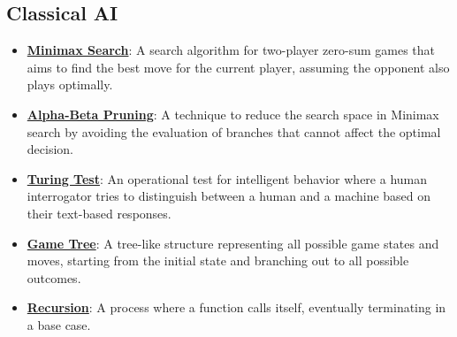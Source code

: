 \documentclass{article}%
\begin{document}
%
\subsection{Classical AI}%
\label{subsec:ClassicalAI}%
\begin{itemize}[leftmargin=*]%
\item \href{https://purdue.brightspace.com/d2l/common/assets/pdfjs-d2l-dist/1.0.14-legacy/web/viewer.html?file=\%2Fcontent\%2Fenforced\%2F1095467-wl.202510.CS.24300.001\%2F02L2-Intro.pdf\%3Fou\%3D1095467\&lang=en-us\&container=d2l-fileviewer-rendered-pdf\&fullscreen=d2l-fileviewer-rendered-pdf-dialog\&height=667#page=22}{\textbf{Minimax Search}}: A search algorithm for two-player zero-sum games that aims to find the best move for the current player, assuming the opponent also plays optimally.%
\item \href{https://purdue.brightspace.com/d2l/common/assets/pdfjs-d2l-dist/1.0.14-legacy/web/viewer.html?file=\%2Fcontent\%2Fenforced\%2F1095467-wl.202510.CS.24300.001\%2F02L2-Intro.pdf\%3Fou\%3D1095467\&lang=en-us\&container=d2l-fileviewer-rendered-pdf\&fullscreen=d2l-fileviewer-rendered-pdf-dialog\&height=667#page=23}{\textbf{Alpha-Beta Pruning}}: A technique to reduce the search space in Minimax search by avoiding the evaluation of branches that cannot affect the optimal decision.%
\item \href{https://purdue.brightspace.com/d2l/common/assets/pdfjs-d2l-dist/1.0.14-legacy/web/viewer.html?file=\%2Fcontent\%2Fenforced\%2F1095467-wl.202510.CS.24300.001\%2F02L2-Intro.pdf\%3Fou\%3D1095467\&lang=en-us\&container=d2l-fileviewer-rendered-pdf\&fullscreen=d2l-fileviewer-rendered-pdf-dialog\&height=667#page=6}{\textbf{Turing Test}}: An operational test for intelligent behavior where a human interrogator tries to distinguish between a human and a machine based on their text-based responses.%
\item \href{https://purdue.brightspace.com/d2l/common/assets/pdfjs-d2l-dist/1.0.14-legacy/web/viewer.html?file=\%2Fcontent\%2Fenforced\%2F1095467-wl.202510.CS.24300.001\%2F02L2-Intro.pdf\%3Fou\%3D1095467\&lang=en-us\&container=d2l-fileviewer-rendered-pdf\&fullscreen=d2l-fileviewer-rendered-pdf-dialog\&height=667#page=11}{\textbf{Game Tree}}: A tree-like structure representing all possible game states and moves, starting from the initial state and branching out to all possible outcomes.%
\item \href{https://purdue.brightspace.com/d2l/common/assets/pdfjs-d2l-dist/1.0.14-legacy/web/viewer.html?file=\%2Fcontent\%2Fenforced\%2F1095467-wl.202510.CS.24300.001\%2F14L1-DepthFS.pdf\%3Fou\%3D1095467\&lang=en-us\&container=d2l-fileviewer-rendered-pdf\&fullscreen=d2l-fileviewer-rendered-pdf-dialog\&height=667#page=2}{\textbf{Recursion}}: A process where a function calls itself, eventually terminating in a base case.%

\end{itemize}
\end{document}
